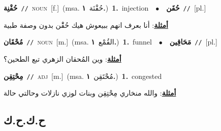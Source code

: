 \documentclass[10pt,a4paper,twoside]{article} %
\begin{document}
\begin{multicols}{2}
{\setlength\topsep{0pt}\textbf{\foreignlanguage{arabic}{حُقْنِة}}\ {\color{gray}\texttt{//}\color{black}}\ \textsc{noun}\ [f.]\ \color{gray}(msa. \foreignlanguage{arabic}{حُقْنَة}~\foreignlanguage{arabic}{\textbf{١.}})\color{black}\ \textbf{1.}~injection\ \ $\bullet$\ \ \setlength\topsep{0pt}\textbf{\foreignlanguage{arabic}{حُقَن}}\ {\color{gray}\texttt{//}\color{black}}\ [pl.]\  \begin{flushright}\color{gray}\foreignlanguage{arabic}{\textbf{\underline{\foreignlanguage{arabic}{أمثلة}}}: أنا بعرف انهم ببيعوش هيك حُقَْن بدون وصفة طبية}\end{flushright}\color{black}} \vspace{2mm}

{\setlength\topsep{0pt}\textbf{\foreignlanguage{arabic}{مُحْقَان}}\ {\color{gray}\texttt{//}\color{black}}\ \textsc{noun}\ [m.]\ \color{gray}(msa. \foreignlanguage{arabic}{القُمْع}~\foreignlanguage{arabic}{\textbf{١.}})\color{black}\ \textbf{1.}~funnel\ \ $\bullet$\ \ \setlength\topsep{0pt}\textbf{\foreignlanguage{arabic}{مَحَاقِين}}\ {\color{gray}\texttt{//}\color{black}}\ [pl.]\  \begin{flushright}\color{gray}\foreignlanguage{arabic}{\textbf{\underline{\foreignlanguage{arabic}{أمثلة}}}: وين المُحقان الزهري تبع الطحين؟}\end{flushright}\color{black}} \vspace{2mm}

{\setlength\topsep{0pt}\textbf{\foreignlanguage{arabic}{مِحْتِقِن}}\ {\color{gray}\texttt{//}\color{black}}\ \textsc{adj}\ [m.]\ \color{gray}(msa. \foreignlanguage{arabic}{مُحْتَقِن}~\foreignlanguage{arabic}{\textbf{١.}})\color{black}\ \textbf{1.}~congested\  \begin{flushright}\color{gray}\foreignlanguage{arabic}{\textbf{\underline{\foreignlanguage{arabic}{أمثلة}}}: والله منخاري مِحْتِقِن وبنات لوزي نازلات وحالتي حالة}\end{flushright}\color{black}} \vspace{2mm}

\vspace{-3mm}
\subsection*{\color{blue}\foreignlanguage{arabic}{ح.ك.ح.ك}\color{blue}{}} 


\end{multicols}
\end{document}
